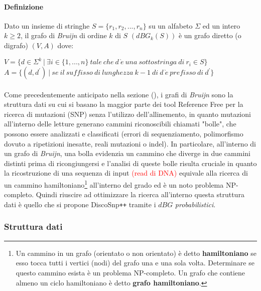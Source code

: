 \documentclass[../main.tex]{subfiles}
\begin{document}
\paragraph{Definizione} Dato un insieme di stringhe $S = \{r_1 , r_2 , ... , r_n\}$ su un alfabeto $\Sigma$ ed un intero $k\geq2$, il grafo di \textit{Bruijn} di ordine $k$ di $S$ $(dBG_k (S))$ è un grafo diretto (o digrafo) $(V,A)$ dove:

\begin{flushleft}
$V = \{d \in \Sigma^k \ |\  \exists i \in \{1, ..., n\} \ tale\ che\ d\ \grave{e}\ una\ sottostringa\ di\ r_i \in S\}$
\linebreak \linebreak
$A = \{ (d,d^\prime)\ |\ se\ il\ suffisso\ di\ lunghezza\ k-1\ di\ d\ \grave{e}\ prefisso\ di\ d^\prime\}$
\end{flushleft}

\paragraph{}Come precedentemente anticipato nella sezione (), i grafi di \textit{Bruijn} sono la struttura dati su cui si basano la maggior parte dei tool Reference Free per la  ricerca di mutazioni (SNP) senza l'utilizzo dell'allinemento, in quanto mutazioni all'interno delle letture generano cammini riconoscibili chiamati "bolle", che possono essere analizzati e classificati (errori di sequenziamento, polimorfismo dovuto a ripetizioni inesatte, reali mutazioni o indel). In particolare, all'interno di un grafo di \textit{Bruijn}, una bolla evidenzia un cammino che diverge in due cammini distinti prima di ricongiungersi e l'analisi di queste bolle risulta cruciale in quanto la ricostruzione di una sequenza di input \textcolor{red}{(read di DNA)} equivale alla ricerca di un cammino hamiltoniano\footnote{Un cammino in un grafo (orientato o non orientato) è detto \textbf{hamiltoniano} se esso tocca tutti i vertici (nodi) del grafo una e una sola volta. Determinare se questo cammino esista è un problema NP-completo. Un grafo che contiene almeno un ciclo hamiltoniano è detto \textbf{grafo hamiltoniano}.} all'interno del grado ed è un noto problema NP-completo. Quindi riuscire ad ottimizzare la ricerca all'interno questa struttura dati è quello che si propone DiscoSnp\texttt{++} tramite i $dBG$ \textit{probabilistici}.

\subsubsection{Struttura dati}
\end{document}
